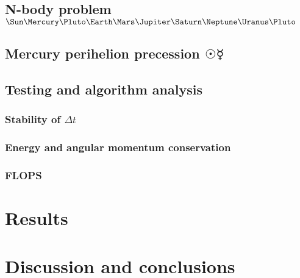 \documentclass[10pt]{article}
\begin{document}
\begin{multicols}{2}
\subsection{N-body problem $\Sun\Mercury\Pluto\Earth\Mars\Jupiter\Saturn\Neptune\Uranus\Pluto$} 
\subsection{Mercury perihelion precession $\Sun \Mercury$}
\subsection{Testing and algorithm analysis}
\subsubsection{Stability of $\Delta t$}
\subsubsection{Energy and angular momentum conservation}
\subsubsection{FLOPS}

\section{Results}

\section{Discussion and conclusions}
{}


\end{multicols}
\end{document}
